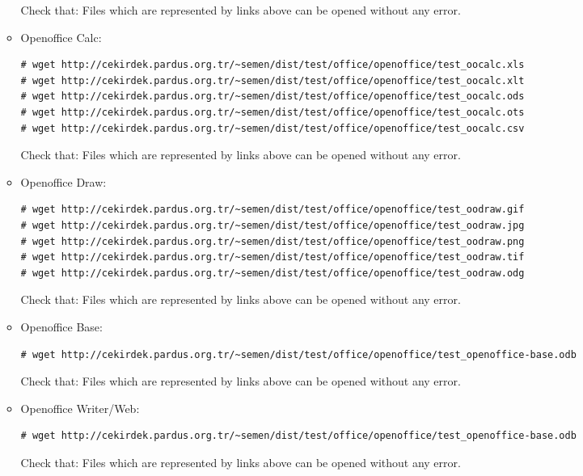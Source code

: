 \documentclass[a4paper,10pt]{article}
\begin{document}
\begin{enumerate}
\begin{itemize}
Check that: Files which are represented by links above can be opened without any error.

\item Openoffice Calc:
\begin{verbatim}
# wget http://cekirdek.pardus.org.tr/~semen/dist/test/office/openoffice/test_oocalc.xls
# wget http://cekirdek.pardus.org.tr/~semen/dist/test/office/openoffice/test_oocalc.xlt
# wget http://cekirdek.pardus.org.tr/~semen/dist/test/office/openoffice/test_oocalc.ods
# wget http://cekirdek.pardus.org.tr/~semen/dist/test/office/openoffice/test_oocalc.ots
# wget http://cekirdek.pardus.org.tr/~semen/dist/test/office/openoffice/test_oocalc.csv	
\end{verbatim}

Check that: Files which are represented by links above can be opened without any error.

\item Openoffice Draw:
\begin{verbatim}
# wget http://cekirdek.pardus.org.tr/~semen/dist/test/office/openoffice/test_oodraw.gif
# wget http://cekirdek.pardus.org.tr/~semen/dist/test/office/openoffice/test_oodraw.jpg
# wget http://cekirdek.pardus.org.tr/~semen/dist/test/office/openoffice/test_oodraw.png
# wget http://cekirdek.pardus.org.tr/~semen/dist/test/office/openoffice/test_oodraw.tif
# wget http://cekirdek.pardus.org.tr/~semen/dist/test/office/openoffice/test_oodraw.odg
\end{verbatim}

Check that: Files which are represented by links above can be opened without any error.
\item Openoffice Base:
\begin{verbatim}
# wget http://cekirdek.pardus.org.tr/~semen/dist/test/office/openoffice/test_openoffice-base.odb
\end{verbatim}

Check that: Files which are represented by links above can be opened without any error.

\item Openoffice Writer/Web:
\begin{verbatim}
# wget http://cekirdek.pardus.org.tr/~semen/dist/test/office/openoffice/test_openoffice-base.odb
\end{verbatim}

Check that: Files which are represented by links above can be opened without any error.

\end{itemize}


\end{enumerate}
\end{document}
